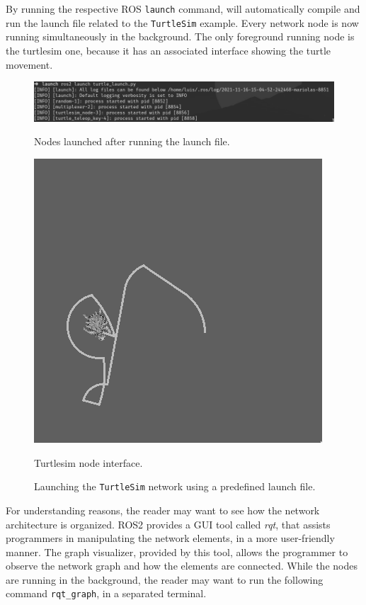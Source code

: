 By running the respective ROS \texttt{launch} command, will automatically compile and run the launch file related to the \texttt{TurtleSim} example. Every network node is now running simultaneously in the background. The only foreground running node is the turtlesim one, because it has an associated interface showing the turtle movement.

\begin{figure}[H]
    \centering
    \begin{minipage}{.6\textwidth}
        \centering
        \includegraphics[width=\linewidth]{images/ts_launch_ros.png}
        \caption{Nodes launched after running the launch file.}
        \label{fig:ts-launch-sub}
    \end{minipage}%
    \begin{minipage}{.4\textwidth}
        \centering
        \includegraphics[width=0.5\linewidth]{images/ts_turtle.png}
        \caption{Turtlesim node interface.}
        \label{fig:ts-turtle}
    \end{minipage}

    \caption{Launching the \texttt{TurtleSim} network using a predefined launch file.}
    \label{fig:ts-launch}
\end{figure}

For understanding reasons, the reader may want to see how the network architecture is organized. ROS2 provides a GUI tool called \textit{rqt}, that assists programmers in manipulating the network elements, in a more user-friendly manner. The graph visualizer, provided by this tool, allows the programmer to observe the network graph and how the elements are connected. While the nodes are running in the background, the reader may want to run the following command \texttt{rqt\_graph}, in a separated terminal.

